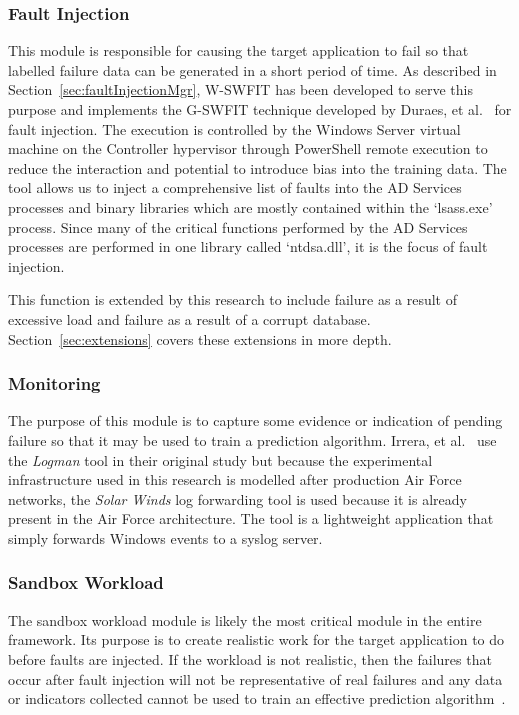 \subsubsection{Fault Injection} \label{sec:faultInjectionTool} 
This module is responsible for causing the target application to fail so that
labelled failure data can be generated in a short period of time.  As described
in Section~\ref{sec:faultInjectionMgr}, W-SWFIT has been developed to serve
this purpose and implements the G-SWFIT technique developed by Duraes, et
al.~\cite{gswfit} for fault injection.  The execution is controlled by the
Windows Server virtual machine on the Controller hypervisor through PowerShell
remote execution to reduce the interaction and potential to introduce bias into
the training data.  The tool allows us to inject a comprehensive list of faults
into the AD Services processes and binary libraries which are mostly contained
within the `lsass.exe' process.  Since many of the critical functions performed
by the AD Services processes are performed in one library called `ntdsa.dll',
it is the focus of fault injection.

This function is extended by this research to include failure as a result of
excessive load and failure as a result of a corrupt database.
Section~\ref{sec:extensions} covers these extensions in more depth.

\subsubsection{Monitoring} \label{sec:sandboxMonitoringTool} 
The purpose of this module is to capture some evidence or indication of pending
failure so that it may be used to train a prediction algorithm.  Irrera, et
al.~\cite{irrera2015} use the \emph{Logman} tool in their original study but
because the experimental infrastructure used in this research is modelled after
production Air Force networks, the \emph{Solar Winds} log forwarding tool is
used because it is already present in the Air Force architecture.  The tool is
a lightweight application that simply forwards Windows events to a syslog
server.

\subsubsection{Sandbox Workload}  \label{sec:sandboxWorkload} 
The sandbox workload module is likely the most critical module in the entire
framework.  Its purpose is to create realistic work for the target application
to do before faults are injected.  If the workload is not realistic, then the
failures that occur after fault injection will not be representative of real
failures and any data or indicators collected cannot be used to train an
effective prediction algorithm~\cite{cotroneo2012,kikuchi2014,irrera2015}.

